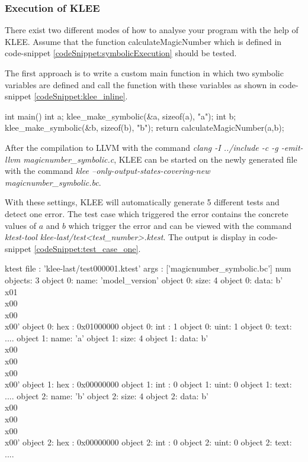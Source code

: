 \subsubsection{Execution of KLEE}
There exist two different modes of how to analyse your program with the help of KLEE. Assume that the function calculateMagicNumber which is defined in code-snippet \ref{codeSnippet:symbolicExecution} should be tested.

The first approach is to write a custom main function in which two symbolic variables are defined and call the function with these variables as shown in code-snippet \ref{codeSnippet:klee_inline}.
\begin{codesnippet}[caption={Main function which defines two symbolic variables and calls the function calculateMagicNumber of code-snippet \ref{codeSnippet:symbolicExecution}}, label={codeSnippet:klee_inline}]
int main() {
  int a;
  klee_make_symbolic(&a, sizeof(a), "a");
  int b;
  klee_make_symbolic(&b, sizeof(b), "b");
  return calculateMagicNumber(a,b);
}
\end{codesnippet}

After the compilation to LLVM with the command \textit{clang -I ../include -c -g -emit-llvm magicnumber\_symbolic.c}, KLEE can be started on the newly generated file with the command \textit{klee --only-output-states-covering-new magicnumber\_symbolic.bc}.

With these settings, KLEE will automatically generate 5 different tests and detect one error. 
The test case which triggered the error contains the concrete values of $a$ and $b$ which trigger the error and can be viewed with the command \textit{ktest-tool klee-last/test<test\_number>.ktest}.
The output is display in code-snippet \ref{codeSnippet:test_case_one}.

\begin{codesnippet}[caption={The test case generated by KLEE which triggers the assertion error when executing it on the code-snippet \ref{codeSnippet:klee_inline}}, label={codeSnippet:test_case_one}]
ktest file : 'klee-last/test000001.ktest'
args       : ['magicnumber_symbolic.bc']
num objects: 3
object 0: name: 'model_version'
object 0: size: 4
object 0: data: b'\\x01\\x00\\x00\\x00'
object 0: hex : 0x01000000
object 0: int : 1
object 0: uint: 1
object 0: text: ....
object 1: name: 'a'
object 1: size: 4
object 1: data: b'\\x00\\x00\\x00\\x00'
object 1: hex : 0x00000000
object 1: int : 0
object 1: uint: 0
object 1: text: ....
object 2: name: 'b'
object 2: size: 4
object 2: data: b'\\x00\\x00\\x00\\x00'
object 2: hex : 0x00000000
object 2: int : 0
object 2: uint: 0
object 2: text: ....
\end{codesnippet}


